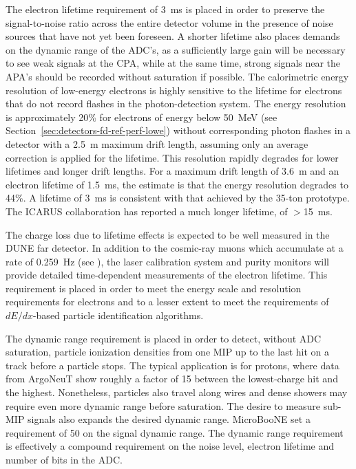 The electron lifetime requirement of 3~ms is placed in order to
preserve the signal-to-noise ratio across the entire detector volume
in the presence of noise sources that have not yet been foreseen.  A
shorter lifetime also places demands on the dynamic range of the
ADC's, as a sufficiently large gain will be necessary to see weak
signals at the CPA, while at the same time, strong signals near the
APA's should be recorded without saturation if possible.  The
calorimetric energy resolution of low-energy electrons is highly
sensitive to the lifetime for electrons that do not record flashes in
the photon-detection system.  The energy resolution is approximately
20\% for electrons of energy below 50~MeV (see Section~\ref{sec:detectors-fd-ref-perf-lowe}) without corresponding
photon flashes in a detector with a 2.5~m maximum drift length,
assuming only an average correction is applied for the lifetime.  This
resolution rapidly degrades for lower lifetimes and longer drift
lengths.  For a maximum drift length of 3.6~m and an electron lifetime
of 1.5~ms, the estimate is that the energy resolution degrades to
44\%.  A lifetime of 3~ms is consistent with that achieved by the
35-ton prototype.  The ICARUS collaboration has reported a much longer
lifetime, of $>$15~ms\cite{Antonello:2014eha}.

The charge loss due to lifetime effects is expected to be well
measured in the DUNE far detector.  In addition to the cosmic-ray
muons which accumulate at a rate of 0.259~Hz (see \anxrates), the
laser calibration system and purity monitors will provide detailed
time-dependent measurements of the electron lifetime.  This
requirement is placed in order to meet the energy scale and resolution
requirements for electrons and to a lesser extent to meet the requirements
of $dE/dx$-based particle identification algorithms.

The dynamic range requirement is placed in order to detect, without ADC saturation, particle
ionization densities from one MIP up to the last hit on a track before
a particle stops.  The typical application is for protons, where data
from ArgoNeuT show roughly a factor of 15 between the lowest-charge
hit and the highest.  Nonetheless, particles also travel along wires
and dense showers may require even more dynamic range before
saturation.  The desire to measure sub-MIP signals also expands the
desired dynamic range.  MicroBooNE set a requirement of 50 on the
signal dynamic range\cite{microboonetdr}.  The dynamic range
requirement is effectively a compound requirement on the noise level,
electron lifetime and number of bits in the ADC.

